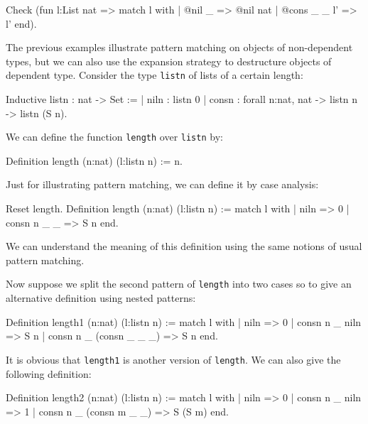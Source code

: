 \begin{coq_example}
Check
  (fun l:List nat =>
     match l with
     | @nil _ => @nil nat
     | @cons _ _ l' => l'
     end).
\end{coq_example}

The previous examples illustrate pattern matching on objects of
non-dependent types, but we can also 
use the expansion strategy to destructure objects of dependent type.
Consider the type \texttt{listn} of lists of a certain length:
\label{listn}

\begin{coq_example}
Inductive listn : nat -> Set :=
  | niln : listn 0
  | consn : forall n:nat, nat -> listn n -> listn (S n).
\end{coq_example}

We can define the function \texttt{length} over \texttt{listn} by:

\begin{coq_example}
Definition length (n:nat) (l:listn n) := n.
\end{coq_example}

Just for illustrating pattern matching, 
we can define it by case analysis:

\begin{coq_example}
Reset length.
Definition length (n:nat) (l:listn n) :=
  match l with
  | niln => 0
  | consn n _ _ => S n
  end.
\end{coq_example}

We can understand the meaning of this definition using the
same notions of usual pattern matching.

%
%
\iffalse
Now suppose we split the second pattern  of \texttt{length} into two 
cases so to give an
alternative definition using nested patterns:
\begin{coq_example}
Definition length1 (n:nat) (l:listn n) :=
  match l with
  | niln => 0
  | consn n _ niln => S n
  | consn n _ (consn _ _ _) => S n
  end.
\end{coq_example}

It is obvious that \texttt{length1} is  another version of
\texttt{length}. We can also give the following definition:
\begin{coq_example}
Definition length2 (n:nat) (l:listn n) :=
  match l with
  | niln => 0
  | consn n _ niln => 1
  | consn n _ (consn m _ _) => S (S m)
  end.
\end{coq_example}

